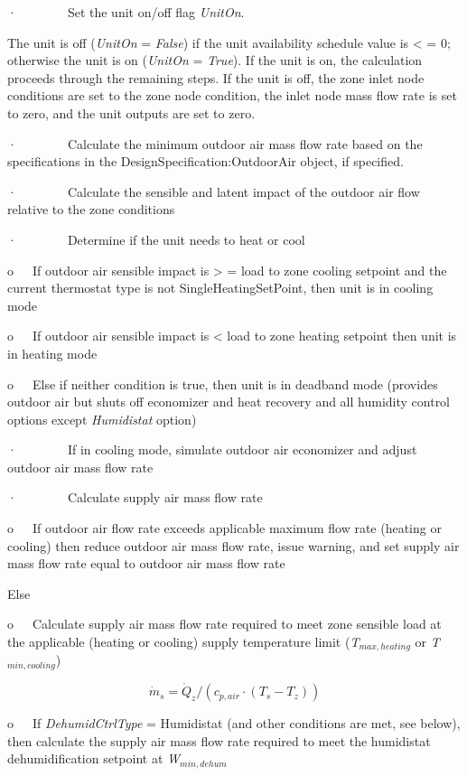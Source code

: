·~~~~~~~~Set the unit on/off flag \emph{UnitOn}.

The unit is off (\emph{UnitOn} = \emph{False}) if the unit availability schedule value is \textless{} = 0; otherwise the unit is on (\emph{UnitOn} = \emph{True}). If the unit is on, the calculation proceeds through the remaining steps. If the unit is off, the zone inlet node conditions are set to the zone node condition, the inlet node mass flow rate is set to zero, and the unit outputs are set to zero.

·~~~~~~~~Calculate the minimum outdoor air mass flow rate based on the specifications in the DesignSpecification:OutdoorAir object, if specified.

·~~~~~~~~Calculate the sensible and latent impact of the outdoor air flow relative to the zone conditions

·~~~~~~~~Determine if the unit needs to heat or cool

o~~~If outdoor air sensible impact is \textgreater{} = load to zone cooling setpoint and the current thermostat type is not SingleHeatingSetPoint, then unit is in cooling mode

o~~~If outdoor air sensible impact is \textless{} load to zone heating setpoint then unit is in heating mode

o~~~Else if neither condition is true, then unit is in deadband mode (provides outdoor air but shuts off economizer and heat recovery and all humidity control options except \emph{Humidistat} option)

·~~~~~~~~If in cooling mode, simulate outdoor air economizer and adjust outdoor air mass flow rate

·~~~~~~~~Calculate supply air mass flow rate

o~~~If outdoor air flow rate exceeds applicable maximum flow rate (heating or cooling) then reduce outdoor air mass flow rate, issue warning, and set supply air mass flow rate equal to outdoor air mass flow rate

Else

o~~~Calculate supply air mass flow rate required to meet zone sensible load at the applicable (heating or cooling) supply temperature limit (\emph{T\(_{max,heating}\)} or \emph{T\(_{min,cooling}\)})

\begin{equation}
{\dot m_s} = {\dot Q_z}/({c_{p,air}}\cdot ({T_s} - {T_z}))
\end{equation}

o~~~If \emph{DehumidCtrlType} = Humidistat (and other conditions are met, see below), then calculate the supply air mass flow rate required to meet the humidistat dehumidification setpoint at \emph{W\(_{min,dehum}\)}

